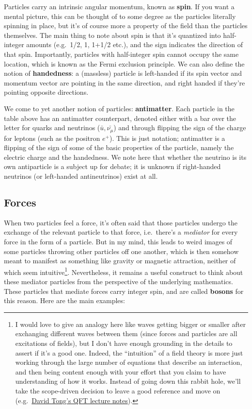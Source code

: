 \documentclass[
  11pt,
  numbers=noendperiod]{book}
\begin{document}
Particles carry an intrinsic angular momentum, known as \textbf{spin}.
If you want a mental picture, this can be thought of to some degree as
the particles literally spinning in place, but it's of course more a
property of the field than the particles themselves. The main thing to
note about spin is that it's quantized into half-integer amounts
(e.g.~1/2, 1, 1+1/2 etc.), and the sign indicates the direction of that
spin. Importantly, particles with half-integer spin cannot occupy the
same location, which is known as the Fermi exclusion principle. We can
also define the notion of \textbf{handedness}: a (massless) particle is
left-handed if its spin vector and momentum vector are pointing in the
same direction, and right handed if they're pointing opposite
directions.

We come to yet another notion of particles: \textbf{antimatter}. Each
particle in the table above has an antimatter counterpart, denoted
either with a bar over the letter for quarks and neutrinos
(\(\bar{u}, \bar{\nu_\mu}\)) and through flipping the sign of the charge
for leptons (such as the positron \(e^+\)). This is just notation;
antimatter is a flipping of the sign of some of the basic properties of
the particle, namely the electric charge and the handedness. We note
here that whether the neutrino is its own antiparticle is a subject up
for debate; it is unknown if right-handed neutrinos (or left-handed
antineutrinos) exist at all.

\hypertarget{forces}{%
\subsection{Forces}\label{forces}}

When two particles feel a force, it's often said that those particles
undergo the exchange of the relevant particle to that force,
i.e.~there's a \emph{mediator} for every force in the form of a
particle. But in my mind, this leads to weird images of some particles
throwing other particles off one another, which is then somehow meant to
manifest as something like gravity or magnetic attraction, neither of
which seem intuitive\footnote{I would love to give an analogy here like
  waves getting bigger or smaller after exchanging different waves
  between them (since forces and particles are all excitations of
  fields), but I don't have enough grounding in the details to assert if
  it's a good one. Indeed, the ``intuition'' of a field theory is more
  just working through the large number of equations that describe an
  interaction, and then being content enough with your effort that you
  claim to have understanding of how it works. Instead of going down
  this rabbit hole, we'll take the scope-driven decision to leave a good
  reference and move on
  (e.g.~\href{https://www.damtp.cam.ac.uk/user/tong/qft.html}{David
  Tong's QFT lecture notes}).}. Nevertheless, it remains a useful
construct to think about these mediator particles from the perspective
of the underlying mathematics. These particles that mediate forces carry
integer spin, and are called \textbf{bosons} for this reason. Here are
the main examples:
\end{document}
